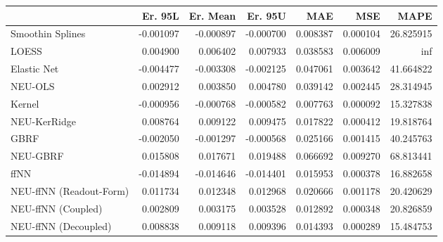 \begin{tabular}{lrrrrrr}
\toprule
{} &   Er. 95L &  Er. Mean &   Er. 95U &       MAE &       MSE &       MAPE \\
\midrule
Smoothin Splines        & -0.001097 & -0.000897 & -0.000700 &  0.008387 &  0.000104 &  26.825915 \\
LOESS                   &  0.004900 &  0.006402 &  0.007933 &  0.038583 &  0.006009 &        inf \\
Elastic Net             & -0.004477 & -0.003308 & -0.002125 &  0.047061 &  0.003642 &  41.664822 \\
NEU-OLS                 &  0.002912 &  0.003850 &  0.004780 &  0.039142 &  0.002445 &  28.314945 \\
Kernel                  & -0.000956 & -0.000768 & -0.000582 &  0.007763 &  0.000092 &  15.327838 \\
NEU-KerRidge            &  0.008764 &  0.009122 &  0.009475 &  0.017822 &  0.000412 &  19.818764 \\
GBRF                    & -0.002050 & -0.001297 & -0.000568 &  0.025166 &  0.001415 &  40.245763 \\
NEU-GBRF                &  0.015808 &  0.017671 &  0.019488 &  0.066692 &  0.009270 &  68.813441 \\
ffNN                    & -0.014894 & -0.014646 & -0.014401 &  0.015953 &  0.000378 &  16.882658 \\
NEU-ffNN (Readout-Form) &  0.011734 &  0.012348 &  0.012968 &  0.020666 &  0.001178 &  20.420629 \\
NEU-ffNN (Coupled)      &  0.002809 &  0.003175 &  0.003528 &  0.012892 &  0.000348 &  20.826859 \\
NEU-ffNN (Decoupled)    &  0.008838 &  0.009118 &  0.009396 &  0.014393 &  0.000289 &  15.484753 \\
\bottomrule
\end{tabular}
